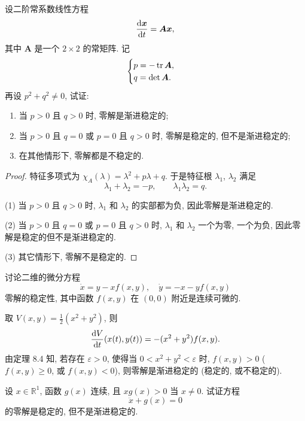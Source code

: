 \begin{exercise}
  设二阶常系数线性方程
  \[\frac{\mathop{}\!\mathrm{d}\bm{x}}{\mathop{}\!\mathrm{d} t} = \bm{A}\bm{x},\]
  其中 $\bm{A}$ 是一个 $2\times 2$ 的常矩阵. 记
  \[\begin{cases}
    p = -\operatorname{tr}\bm{A}, \\
    q = \det\bm{A}.
  \end{cases}\]
  再设 $p^2+q^2\neq 0$, 试证:
  \begin{enumerate}[(1)]
    \item 当 $p>0$ 且 $q>0$ 时, 零解是渐进稳定的;
    \item 当 $p>0$ 且 $q=0$ 或 $p=0$ 且 $q>0$ 时, 零解是稳定的, 但不是渐进稳定的;
    \item 在其他情形下, 零解都是不稳定的.
  \end{enumerate}
\end{exercise}

\begin{proof}
  特征多项式为 $\chi_A(\lambda) = \lambda^2 + p\lambda +q$. 于是特征根 $\lambda_1$,
  $\lambda_2$ 满足
  \[\lambda_1 + \lambda_2 = -p,\qquad \lambda_1\lambda_2 = q.\]

  (1) 当 $p>0$ 且 $q>0$ 时, $\lambda_1$ 和 $\lambda_2$ 的实部都为负, 因此零解是渐进稳定的.

  (2) 当 $p>0$ 且 $q=0$ 或 $p=0$ 且 $q>0$ 时, $\lambda_1$ 和 $\lambda_2$ 一个为零, 一个为负,
  因此零解是稳定的但不是渐进稳定的.

  (3) 其它情形下, 零解不是稳定的.
\end{proof}



\begin{exercise}
  讨论二维的微分方程
  \[\dot{x} = y-xf(x,y),\quad \dot{y} = -x-yf(x,y)\]
  零解的稳定性, 其中函数 $f(x,y)$ 在 $(0,0)$ 附近是连续可微的.
\end{exercise}

\begin{solution}
  取 $V(x,y) = \frac12 (x^2+y^2)$, 则
  \[\frac{\mathop{}\!\mathrm{d} V}{\mathop{}\!\mathrm{d} t}(x(t), y(t)) = -(x^2+y^2) f(x,y).\]
  由定理 8.4 知, 若存在 $\varepsilon>0$, 使得当 $0< x^2 + y^2 < \varepsilon$ 时,
  $f(x,y) > 0$ ($f(x,y)\geq 0$, 或 $f(x,y)<0$),
  则零解是渐进稳定的 (稳定的, 或不稳定的).
\end{solution}



\begin{exercise}
  设 $x\in\mathbb{R}^1$, 函数 $g(x)$ 连续, 且 $xg(x)>0$ 当 $x\neq 0$. 试证方程
  \[\ddot{x}+g(x) = 0\]
  的零解是稳定的, 但不是渐进稳定的.
\end{exercise}

